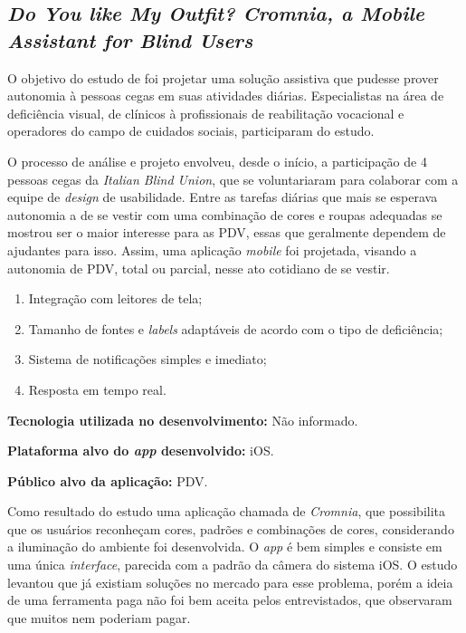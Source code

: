 \subsection{\emph{Do You like My Outfit? Cromnia, a Mobile Assistant for Blind Users}}

O objetivo do estudo de  foi projetar uma solução assistiva que pudesse prover autonomia à pessoas cegas em suas atividades diárias.
Especialistas na área de deficiência visual, de clínicos à profissionais de reabilitação vocacional e operadores do campo de cuidados sociais, participaram do estudo.


O processo de análise e projeto envolveu, desde o início, a participação de 4 pessoas cegas da \emph{Italian Blind Union}, que se voluntariaram para colaborar com a equipe de \emph{design} de usabilidade.
Entre as tarefas diárias que mais se esperava autonomia a de se vestir com uma combinação de cores e roupas adequadas se mostrou ser o maior interesse para as PDV, essas que geralmente dependem de ajudantes para isso.
Assim, uma aplicação \emph{mobile} foi projetada, visando a autonomia de PDV, total ou parcial, nesse ato cotidiano de se vestir.

\begin{enumerate}
    \item Integração com leitores de tela;
    \item Tamanho de fontes e \emph{labels} adaptáveis de acordo com o tipo de deficiência;
    \item Sistema de notificações simples e imediato;
    \item Resposta em tempo real.
\end{enumerate}

\textbf{Tecnologia utilizada no desenvolvimento:} Não informado.

\textbf{Plataforma alvo do \emph{app} desenvolvido:} iOS.

\textbf{Público alvo da aplicação:} PDV\@.

Como resultado do estudo uma aplicação chamada de \emph{Cromnia}, que possibilita que os usuários reconheçam cores, padrões e combinações de cores, considerando a iluminação do ambiente foi desenvolvida.
O \emph{app} é bem simples e consiste em uma única \emph{interface}, parecida com a padrão da câmera do sistema iOS.
O estudo levantou que já existiam soluções no mercado para esse problema, porém a ideia de uma ferramenta paga não foi bem aceita pelos entrevistados, que observaram que muitos nem poderiam pagar.

